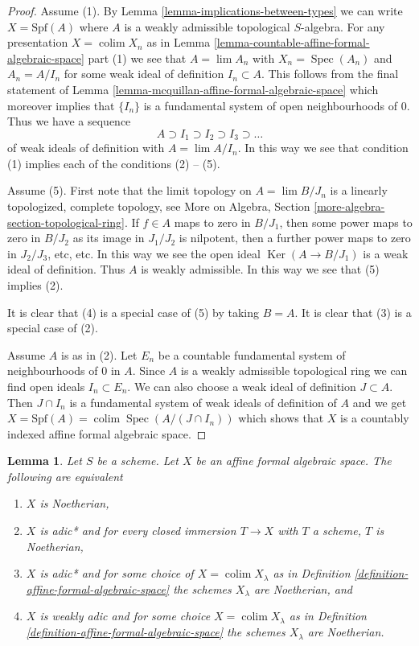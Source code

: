 \documentclass{stacks-project}
\theoremstyle{plain}
\newtheorem{lemma}[subsection]{Lemma}
\theoremstyle{definition}
\theoremstyle{remark}
\numberwithin{equation}{subsection}
\def\lim{\mathop{\mathrm{lim}}\nolimits}
\def\colim{\mathop{\mathrm{colim}}\nolimits}
\def\Spec{\mathop{\mathrm{Spec}}}
\def\Ker{\mathop{\mathrm{Ker}}}
\begin{document}
\begin{proof}
Assume (1). By Lemma \ref{lemma-implications-between-types}
we can write $X = \text{Spf}(A)$ where $A$ is a weakly admissible
topological $S$-algebra. For any presentation $X = \colim X_n$ as in
Lemma \ref{lemma-countable-affine-formal-algebraic-space} part (1)
we see that $A = \lim A_n$ with $X_n = \Spec(A_n)$ and
$A_n = A/I_n$ for some weak ideal of definition $I_n \subset A$.
This follows from the final statement of
Lemma \ref{lemma-mcquillan-affine-formal-algebraic-space}
which moreover implies that $\{I_n\}$ is a fundamental system
of open neighbourhoods of $0$. Thus we have a sequence
$$
A \supset I_1 \supset I_2 \supset I_3 \supset \ldots
$$
of weak ideals of definition with $A = \lim A/I_n$. In this way
we see that condition (1) implies each of the conditions (2) -- (5).

\medskip\noindent
Assume (5). First note that the limit topology on
$A = \lim B/J_n$ is a linearly topologized, complete topology, see
More on Algebra, Section \ref{more-algebra-section-topological-ring}.
If $f \in A$ maps to zero in $B/J_1$, then some power maps to zero
in $B/J_2$ as its image in $J_1/J_2$ is nilpotent, then a further
power maps to zero in $J_2/J_3$, etc, etc. In this way we see
the open ideal $\Ker(A \to B/J_1)$ is a weak ideal of definition.
Thus $A$ is weakly admissible. In this way we see that (5) implies (2).

\medskip\noindent
It is clear that (4) is a special case of (5) by taking $B = A$.
It is clear that (3) is a special case of (2).

\medskip\noindent
Assume $A$ is as in (2). Let $E_n$ be a countable fundamental
system of neighbourhoods of $0$ in $A$. Since $A$ is a weakly
admissible topological ring we can find open ideals $I_n \subset E_n$.
We can also choose a weak ideal of definition $J \subset A$.
Then $J \cap I_n$ is a fundamental system of weak ideals of definition
of $A$ and we get
$X = \text{Spf}(A) = \colim \Spec(A/(J \cap I_n))$
which shows that $X$ is a countably indexed affine formal algebraic space.
\end{proof}

\begin{lemma}
\label{lemma-characterize-noetherian-affine}
Let $S$ be a scheme. Let $X$ be an affine formal algebraic space.
The following are equivalent
\begin{enumerate}
\item $X$ is Noetherian,
\item $X$ is adic* and for every closed immersion $T \to X$ with $T$ a scheme,
$T$ is Noetherian,
\item $X$ is adic* and for some choice of $X = \colim X_\lambda$ as in
Definition \ref{definition-affine-formal-algebraic-space}
the schemes $X_\lambda$ are Noetherian, and
\item $X$ is weakly adic and for some choice $X = \colim X_\lambda$
as in Definition \ref{definition-affine-formal-algebraic-space}
the schemes $X_\lambda$ are Noetherian.
\end{enumerate}
\end{lemma}
\end{document}

